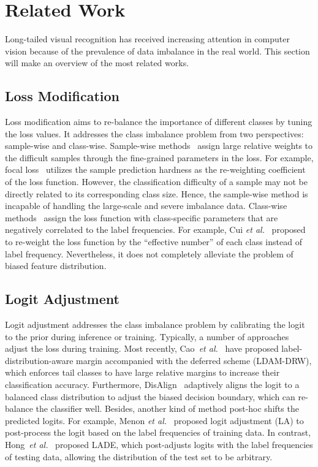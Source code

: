 \documentclass{article}
\def\etal{\emph{et al.}}
\begin{document}
\section{Related Work}
\label{sec:work}
Long-tailed visual recognition has received increasing attention in computer vision because of the prevalence of data imbalance in the real world. This section will make an overview of the most related works.

\subsection{Loss Modification}
Loss modification aims to re-balance the importance of different classes by tuning the loss values. It addresses the class imbalance problem from two perspectives: sample-wise and class-wise. Sample-wise methods~\cite{Mengye2018Learning, Tsung2020Focal} assign large relative weights to the difficult samples through the fine-grained parameters in the loss. For example, focal loss~\cite{Tsung2020Focal} utilizes the sample prediction hardness as the re-weighting coefficient of the loss function. However, the classification difficulty of a sample may not be directly related to its corresponding class size. Hence, the sample-wise method is incapable of handling the large-scale and severe imbalance data. Class-wise methods~\cite{Salman2018Cost, cui2019class, tan2020equalization} assign the loss function with class-specific parameters that are negatively correlated to the label frequencies. For example, Cui \etal~\cite{cui2019class} proposed to re-weight the loss function by the ``effective number'' of each class instead of label frequency. Nevertheless, it does not completely alleviate the problem of biased feature distribution.

\subsection{Logit Adjustment}
Logit adjustment addresses the class imbalance problem by calibrating the logit to the prior during inference or training. Typically, a number of approaches adjust the loss during training. Most recently, Cao~\etal~\cite{cao2019learning} have proposed label-distribution-aware margin accompanied with the deferred scheme (LDAM-DRW), which enforces tail classes to have large relative margins to increase their classification accuracy. Furthermore, DisAlign~\cite{zhang2021distribution} adaptively aligns the logit to a balanced class distribution to adjust the biased decision boundary, which can re-balance the classifier well. Besides, another kind of method post-hoc shifts the predicted logits. For example, Menon \etal~\cite{menon21long} proposed logit adjustment (LA) to post-process the logit based on the label frequencies of training data. In contrast, Hong~\etal~\cite{Hong2021CVPR} proposed LADE, which post-adjusts logits with the label frequencies of testing data, allowing the distribution of the test set to be arbitrary.
\end{document}
